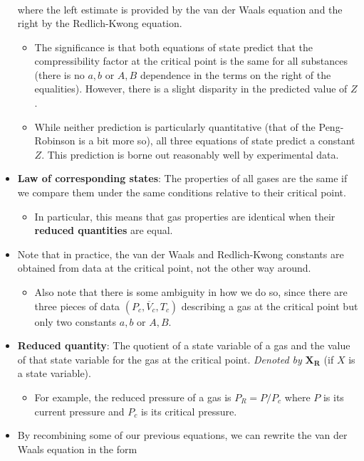 \documentclass[../notes.tex]{subfiles}
\begin{document}
\begin{itemize}
\begin{align*}
    \end{align*}
    where the left estimate is provided by the van der Waals equation and the right by the Redlich-Kwong equation.
    \begin{itemize}
        \item The significance is that both equations of state predict that the compressibility factor at the critical point is the same for all substances (there is no $a,b$ or $A,B$ dependence in the terms on the right of the equalities). However, there is a slight disparity in the predicted value of $Z$.
        \item While neither prediction is particularly quantitative (that of the Peng-Robinson is a bit more so), all three equations of state predict a constant $Z$. This prediction is borne out reasonably well by experimental data.
    \end{itemize}
    \item \textbf{Law of corresponding states}: The properties of all gases are the same if we compare them under the same conditions relative to their critical point.
    \begin{itemize}
        \item In particular, this means that gas properties are identical when their \textbf{reduced quantities} are equal.
    \end{itemize}
    \item Note that in practice, the van der Waals and Redlich-Kwong constants are obtained from data at the critical point, not the other way around.
    \begin{itemize}
        \item Also note that there is some ambiguity in how we do so, since there are three pieces of data $(P_c,\overline{V}_c,T_c)$ describing a gas at the critical point but only two constants $a,b$ or $A,B$.
    \end{itemize}
    \item {}\textbf{Reduced quantity}: The quotient of a state variable of a gas and the value of that state variable for the gas at the critical point. \emph{Denoted by} $\bm{X_R}$ (if $X$ is a state variable).
    \begin{itemize}
        \item For example, the reduced pressure of a gas is $P_R=P/P_c$ where $P$ is its current pressure and $P_c$ is its critical pressure.
    \end{itemize}
    \item By recombining some of our previous equations, we can rewrite the van der Waals equation in the form

\end{itemize}
\end{document}

